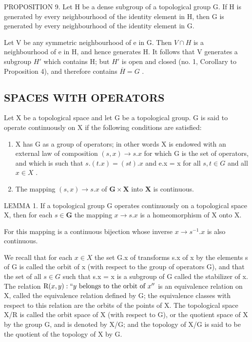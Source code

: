 PROPOSITION 9. Let H be a dense subgroup of a topological group G. If H is generated by every neighbourhood of the identity element in H, then G is generated by every neighbourhood of the identity element in G.

Let V be any symmetric neighbourhood of e in G. Then \(V \cap H\) is a neighbourhood of e in H, and hence generates H. It follows that V generates a subgroup \(H'\) which contains H; but \(H'\) is open and closed (no. 1, Corollary to Proposition 4), and therefore contains \(\overline{H} = G\) .

\subsection{SPACES WITH OPERATORS}

Let X be a topological space and let G be a topological group. G is said to operate continuously on X if the following conditions are satisfied:

\begin{enumerate}
\def\labelenumi{\arabic{enumi})}
\item
  X has G as a group of operators; in other words X is endowed with an external law of composition \((s, x) \to s.x\) for which G is the set of operators, and which is such that \(s.(t.x) = (st).x\) and e.x = x for all \(s, t \in G\) and all \(x \in X\) .
\item
  The mapping \((s, x) \to s.x\) of \(\mathbf{G} \times \mathbf{X}\) into \(\mathbf{X}\) is continuous.
\end{enumerate}

LEMMA 1. If a topological group G operates continuously on a topological space X, then for each \(s \in \mathbf{G}\) the mapping \(x \to s.x\) is a homeomorphism of X onto X.

For this mapping is a continuous bijection whose inverse \(x \rightarrow s^{-1}.x\) is also continuous.

We recall that for each \(x \in X\) the set G.x of transforms s.x of x by the elements s of G is called the orbit of x (with respect to the group of operators G), and that the set of all \(s \in G\) such that s.x = x is a subgroup of G called the stabilizer of x. The relation \(\mathrm{R}(x, y) : ``y \text{ belongs to the orbit of } x''\) is an equivalence relation on X, called the equivalence relation defined by G; the equivalence classes with respect to this relation are the orbits of the points of X. The topological space X/R is called the orbit space of X (with respect to G), or the quotient space of X by the group G, and is denoted by X/G; and the topology of X/G is said to be the quotient of the topology of X by G.

